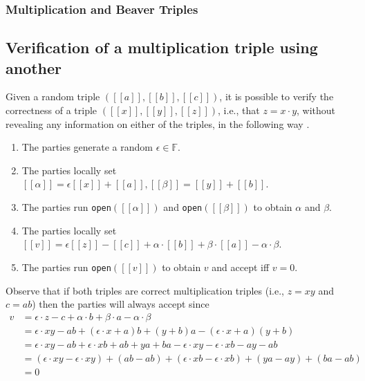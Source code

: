 \documentclass[twoside,11pt,openright]{report}
\theoremstyle{definition}
\theoremstyle{plain}
\begin{document}
\subsubsection{Multiplication and Beaver Triples}
\label{sec:beaver}

\subsection{Verification of a multiplication triple using another}
\label{sec:verify}
Given a random triple $([[a]], [[b]], [[c]])$, it is possible to verify the correctness of a triple $([[x]], [[y]], [[z]])$, i.e., that $z = x \cdot y$, without revealing any information on either of the triples, in the following way \cite{baum2020concretely}.

\begin{enumerate}
  \item The parties generate a random $\epsilon \in \mathbb{F}$.
  \item The parties locally set $[[\alpha]] = \epsilon[[x]] + [[a]], [[\beta]] = [[y]] + [[b]]$.
  \item The parties run \texttt{open}$([[\alpha]])$ and \texttt{open}$([[\beta]])$ to obtain $\alpha$ and $\beta$.
  \item The parties locally set $[[v]] = \epsilon[[z]] - [[c]] + \alpha  \cdot [[b]] + \beta  \cdot [[a]] - \alpha  \cdot \beta$.
  \item The parties run \texttt{open}$([[v]])$ to obtain $v$ and accept iff $v = 0$.

\end{enumerate}
Observe that if both triples are correct multiplication triples (i.e., $z = xy$ and $c = ab$) then the parties will always accept since
\begin{align}
  v & = \epsilon \cdot z - c + \alpha \cdot b + \beta \cdot a - \alpha \cdot \beta                                            \\
    & = \epsilon \cdot xy - ab + (\epsilon \cdot x + a)b + (y + b)a - (\epsilon \cdot x + a)(y + b)                           \\
    & = \epsilon \cdot xy - ab + \epsilon \cdot xb + ab + ya + ba - \epsilon \cdot xy - \epsilon \cdot xb - ay - ab           \\
    & = (\epsilon \cdot xy - \epsilon \cdot xy) + (ab - ab) + (\epsilon \cdot xb - \epsilon \cdot xb) + (ya - ay) + (ba - ab) \\
    & = 0
\end{align}
\end{document}
